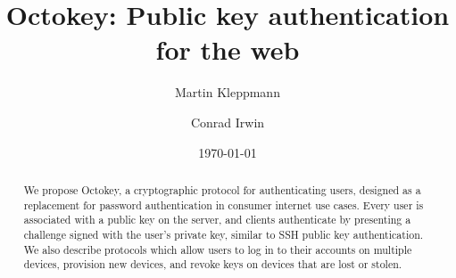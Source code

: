 \documentclass{article}
\begin{document}
\title{Octokey: Public key authentication for the web}
\author{Martin Kleppmann \and Conrad Irwin}
\date{\today}
\maketitle

\begin{abstract}
We propose Octokey, a cryptographic protocol for authenticating users, designed as a replacement for
password authentication in consumer internet use cases. Every user is associated with a public key
on the server, and clients authenticate by presenting a challenge signed with the user's private
key, similar to SSH public key authentication. We also describe protocols which allow users to log
in to their accounts on multiple devices, provision new devices, and revoke keys on devices that are
lost or stolen.
\end{abstract}






{}

\end{document}
